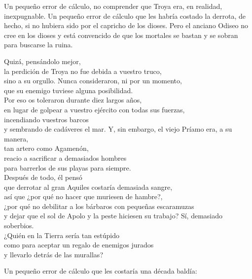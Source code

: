 Un pequeño error de cálculo, no comprender que Troya era, en realidad, inexpugnable. Un pequeño error de cálculo que les habría costado la derrota, de hecho, si no hubiera sido por el capricho de los dioses. Pero el anciano Odiseo no cree en los dioses y está convencido de que los mortales se bastan y se sobran para buscarse la ruina.

\begin{versopropio}
Quizá, pensándolo mejor,\\
la perdición de Troya no fue debida a vuestro truco,\\
sino a su orgullo. Nunca consideraron, ni por un momento,\\
que su enemigo tuviese alguna posibilidad.\\
Por eso os toleraron durante diez largos años,\\
en lugar de golpear a vuestro ejército con todas sus fuerzas,\\
incendiando vuestros barcos\\
y sembrando de cadáveres el mar.
\stanzabreak
Y, sin embargo, el viejo Príamo era, a su manera,\\
tan artero como Agamenón,\\
reacio a sacrificar a demasiados hombres\\
para barrerlos de sus playas para siempre.\\
Después de todo, él pensó\\
que derrotar al gran Aquiles costaría demasiada sangre,\\
así que ¿por qué no hacer que muriesen de hambre?,\\
¿por qué no debilitar a los bárbaros con pequeñas escaramuzas\\
y dejar que el sol de Apolo y la peste hiciesen su trabajo?
\stanzabreak
Sí, demasiado soberbios.\\
¿Quién en la Tierra sería tan estúpido\\
como para aceptar un regalo de enemigos jurados\\
y llevarlo detrás de las murallas?
\end{versopropio}

Un pequeño error de cálculo que les costaría una década baldía:

